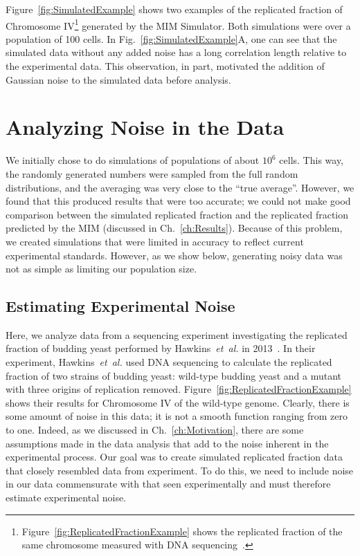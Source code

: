 		Figure~\ref{fig:SimulatedExample} shows two examples of the replicated fraction of Chromosome IV\footnote{
		Figure~\ref{fig:ReplicatedFractionExample} shows the replicated fraction of the same chromosome measured with DNA sequencing~\cite{StochasticTermination}.}
		generated by the MIM Simulator.
		Both simulations were over a population of 100 cells.
		In Fig.~\ref{fig:SimulatedExample}A, one can see that the simulated data without any added noise has a long correlation length relative to the experimental data.
		This observation, in part, motivated the addition of Gaussian noise to the simulated data before analysis.
		
		
	\section{Analyzing Noise in the Data}
	\label{sec:Noise}
	
	We initially chose to do simulations of populations of about $10^6$ cells.
	This way, the randomly generated numbers were sampled from the full random distributions, and the averaging was very close to the ``true average''.
	However, we found that this produced results that were too accurate; we could not make good comparison between the simulated replicated fraction and the replicated fraction predicted by the MIM (discussed in Ch.~\ref{ch:Results}).
	Because of this problem, we created simulations that were limited in accuracy to reflect current experimental standards.
	However, as we show below, generating noisy data was not as simple as limiting our population size.
	
	
		\subsection{Estimating Experimental Noise}
		\label{subsec:SequencingNoise}
		
		Here, we analyze data from a sequencing experiment investigating the replicated fraction of budding yeast performed by Hawkins~\emph{et~al.} in 2013~\cite{StochasticTermination}.
		In their experiment, Hawkins~\emph{et~al.} used DNA sequencing to calculate the replicated fraction of two strains of budding yeast: wild-type budding yeast and a mutant with three origins of replication removed.
		Figure~\ref{fig:ReplicatedFractionExample} shows their results for Chromosome IV of the wild-type genome.
		Clearly, there is some amount of noise in this data; it is not a smooth function ranging from zero to one.
		Indeed, as we discussed in Ch.~\ref{ch:Motivation}, there are some assumptions made in the data analysis that add to the noise inherent in the experimental process.
		Our goal was to create simulated replicated fraction data that closely resembled data from experiment.
		To do this, we need to include noise in our data commensurate with that seen experimentally and must therefore estimate experimental noise.
		
